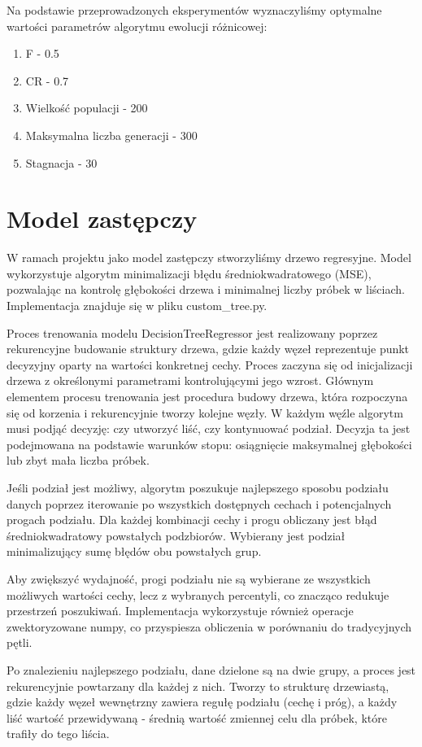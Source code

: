 \documentclass{article}
\begin{document}
Na podstawie przeprowadzonych eksperymentów wyznaczyliśmy optymalne wartości parametrów algorytmu ewolucji różnicowej:
\begin{enumerate}
    \item F - 0.5
    \item CR - 0.7
    \item Wielkość populacji - 200
    \item Maksymalna liczba generacji - 300
    \item Stagnacja - 30
\end{enumerate}


\section{Model zastępczy}
W ramach projektu jako model zastępczy stworzyliśmy drzewo regresyjne. Model wykorzystuje algorytm minimalizacji błędu średniokwadratowego (MSE), pozwalając na kontrolę głębokości drzewa i minimalnej liczby próbek w liściach. Implementacja znajduje się w pliku custom\_tree.py.

Proces trenowania modelu DecisionTreeRegressor jest realizowany poprzez rekurencyjne budowanie struktury drzewa, gdzie każdy węzeł reprezentuje punkt decyzyjny oparty na wartości konkretnej cechy.  Proces zaczyna się od inicjalizacji drzewa z określonymi parametrami kontrolującymi jego wzrost. Głównym elementem procesu trenowania jest procedura budowy drzewa, która rozpoczyna się od korzenia i rekurencyjnie tworzy kolejne węzły. W każdym węźle algorytm musi podjąć decyzję: czy utworzyć liść, czy kontynuować podział. Decyzja ta jest podejmowana na podstawie warunków stopu: osiągnięcie maksymalnej głębokości lub zbyt mała liczba próbek.

Jeśli podział jest możliwy, algorytm poszukuje najlepszego sposobu podziału danych poprzez iterowanie po wszystkich dostępnych cechach i potencjalnych progach podziału. Dla każdej kombinacji cechy i progu obliczany jest błąd średniokwadratowy powstałych podzbiorów. Wybierany jest podział minimalizujący sumę błędów obu powstałych grup.

Aby zwiększyć wydajność, progi podziału nie są wybierane ze wszystkich możliwych wartości cechy, lecz z wybranych percentyli, co znacząco redukuje przestrzeń poszukiwań. Implementacja wykorzystuje również operacje zwektoryzowane numpy, co przyspiesza obliczenia w porównaniu do tradycyjnych pętli.

Po znalezieniu najlepszego podziału, dane dzielone są na dwie grupy, a proces jest rekurencyjnie powtarzany dla każdej z nich. Tworzy to strukturę drzewiastą, gdzie każdy węzeł wewnętrzny zawiera regułę podziału (cechę i próg), a każdy liść wartość przewidywaną - średnią wartość zmiennej celu dla próbek, które trafiły do tego liścia.
\end{document}
